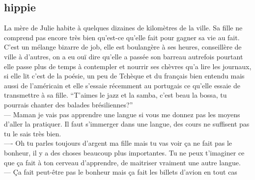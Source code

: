 \documentclass{article}
\begin{document}
\begin{comment}
Certains, les noumeniens, pensent que le relief
sous-marin est signe d'une ancienne civilization qui aurait terraformé la terre,
c'est à dire modifier son climat et ses fonctions essentiellement géologiques
pour la rendre plus habitable.  On ne parle pas d'Atlantis ou de Troie mais de
quelque chose de beaucoup plus grand, et inquiétant. Selon Alexandre Laffarie,
un des modérateur du forum phare de la théorie, ce n'est qu'en découvrant les
rites de cette civilization pré cro magnon que l'on pourrait éviter l'apocalypse
environnementale. Bipèdes ces anciens, pourquoi pas? Deux yeux, peut-être trois,
d'où la théorie universelle du troisième oeil chez les nouveaux paiens, peut-être.
Peut importe pour les ``Laffarites''; l'important est de retracer leur influence
sur la terre de façon concrète. Sceptique Paul, bien sur, c'est un scientifique après
tout; c'est aussi pour cette raison qu'il n'écarte aucune hypothèse.
Une des théorie des Laffarites est qu'il y a deux grandes civilization qui se sont jouées
la guerre climatique, une du haut, au mont blanc à peu près, et une perdue maintenant
dans les failles sismiques.

\end{comment}

\clearpage


\subsection{hippie}

La mère de Julie habite à quelques dizaines de kilomètres de la ville. Sa fille
ne comprend pas encore très bien qu’est-ce qu’elle fait pour gagner sa vie au
fait. C’est un mélange bizarre de job, elle est boulangère à ses heures,
conseillère de ville à d’autres, on a eu ouï dire qu’elle a passée son barreau
autrefois pourtant elle passe plus de temps à contempler et nourrir ses chèvres
qu’a lire les journaux, si elle lit c’est de la poésie, un peu de Tchèque et du
français bien entendu mais aussi de l’américain et elle s’essaie récemment au
portugais ce qu’elle essaie de transmettre à sa fille. “T’aimes le jazz et la
samba, c’est beau la bossa, tu pourrais chanter des balades brésiliennes?”\\
--- Maman je vais pas apprendre une langue si vous me donnez pas les moyens
d'aller la pratiquer. Il faut s'immerger dans une langue, des cours ne suffisent
pas tu le sais très bien.\\
---- Oh tu parles toujours d'argent ma fille mais tu vas voir ça ne fait pas le bonheur,
il y a des choses beaucoup plus importantes. Tu ne peux t'imaginer ce que ça fait à ton cerveau
d'apprendre, de maitriser vraiment une autre langue.\\
--- Ça fait peut-être pas le bonheur mais ça fait les billets d'avion en tout cas
\clearpage
\end{document}
